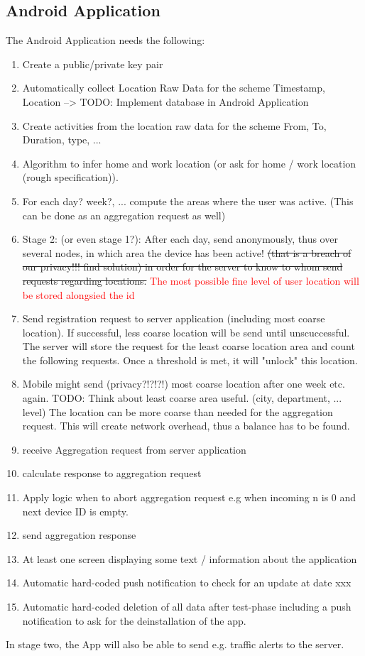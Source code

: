 \subsection{Android Application}
The Android Application needs the following:
\begin{enumerate}
	\item Create a public/private key pair
	\item Automatically collect Location Raw Data for the scheme {Timestamp, Location} --> TODO: Implement database in Android Application
	\item Create activities from the location raw data for the scheme {From, To, Duration, type, ...}
	\item Algorithm to infer home and work location (or ask for home / work location (rough specification)).
	\item For each day? week?, ... compute the areas where the user was active. (This can be done as an aggregation request as well)
	\item Stage 2: (or even stage 1?): After each day, send anonymously, thus over several nodes, in which area the device has been active! \sout{(that is a breach of our privacy!!! find solution) in order for the server to know to whom send requests regarding locations.} \textcolor{red}{The most possible fine level of user location will be stored alongsied the id}
	\item Send registration request to server application (including most coarse location). If successful, less coarse location will be send until unscuccessful. The server will store the request for the least coarse location area and count the following requests. Once a threshold is met, it will "unlock" this location.
	\item Mobile might send (privacy?!?!?!) most coarse location after one week etc. again. TODO: Think about least coarse area useful. (city, department, ... level)
	The location can be more coarse than needed for the aggregation request. This will create network overhead, thus a balance has to be found.
	\item receive Aggregation request from server application
	\item calculate response to aggregation request
	\item Apply logic when to abort aggregation request e.g when incoming n is 0 and next device ID is empty.
	\item send aggregation response
	\item At least one screen displaying some text / information about the application
	\item Automatic hard-coded push notification to check for an update at date xxx
	\item Automatic hard-coded deletion of all data after test-phase including a push notification to ask for the deinstallation of the app.
\end{enumerate}
In stage two, the App will also be able to send e.g. traffic alerts to the server.

